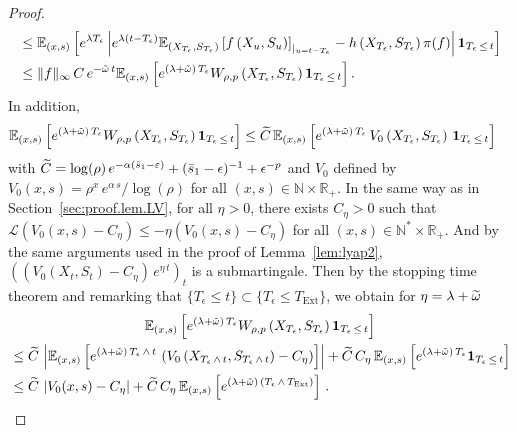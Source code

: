 \documentclass[AHL,Unicode,longabstracts,published]{cedram}
\newcommand{\RR}{\mathbb{R}}
\newcommand{\NN}{\mathbb{N}}
\newcommand{\EE}{\mathbb{E}}
\newcommand{\clL}{\mathcal{L}}
\newcommand{\Text}{T_{\mathrm{Ext}}}
\newcommand{\1}{\mathbf{1}}
\let\oldtilde\tilde
\renewcommand*{\tilde}[1]{\mathchoice{\widetilde{#1}}{\widetilde{#1}}{\oldtilde{#1}}{\oldtilde{#1}}}
\begin{document}
\begin{proof}
\begin{multline}
\begin{aligned}
&\leq
\EE_{(x,s)} \left[e^{\lambda T_\epsilon} \left| e^{\lambda(t-T_\epsilon)}
\EE_{\left(X_{T_\epsilon},S_{T_\epsilon}\right)}\left[f\left(X_{u},S_{u}\right) \right]_{\vert_{u=t-T_\epsilon}}-h\left(X_{T_\epsilon},S_{T_\epsilon}\right)\pi(f)\right| \1_{T_\epsilon\,\leq\,t} \right]\\
&\leq \|f\|_\infty\,C\,e^{-\tilde\omega\,t}
\EE_{(x,s)} \left[e^{\left(\lambda+\tilde\omega\right)\,T_\epsilon}W_{\rho,p}\left(X_{T_\epsilon},S_{T_\epsilon}\right) \1_{T_\epsilon\,\leq\,t} \right].
\end{aligned}
\end{multline}
In addition,
\begin{align*}
\EE_{(x,s)} \left[e^{\left(\lambda+\tilde \omega\right)\, T_\epsilon}W_{\rho,p}\left(X_{T_\epsilon},S_{T_\epsilon}\right) \1_{T_\epsilon\,\leq\,t} \right] &\leq
\tilde C\, \EE_{(x,s)} \left[e^{\left(\lambda+\tilde\omega\right)\, T_\epsilon} \,V_0\left(X_{T_\epsilon},S_{T_\epsilon}\right) \, \1_{T_\epsilon\,\leq\,t} \right]
\end{align*}
with $\tilde C=\log(\rho)\,e^{-\alpha(\bar s_1-\varepsilon)}+(\bar s_1-\epsilon)^{-1}+\epsilon^{-p}$ and $V_0$ defined by $V_0(x,s)=\rho^{x}\,e^{\alpha\,s}/\log(\rho)$ for all $(x,s)\in \NN\times \RR_+$. In the same way as in Section~\ref{sec:proof.lem.LV}, for all $\eta>0$, there exists $C_\eta>0$ such that $\clL(V_0(x,s)-C_\eta)\leq -\eta (V_0(x,s) - C_\eta)$ for all $(x,s)\in \NN^*\times \RR_+$. And by the same arguments used in the proof of Lemma~\ref{lem:lyap2}, $((V_0(X_t,S_t)-C_\eta)\,e^{\eta\,t})_t$ is a submartingale. Then by the stopping time theorem and remarking that $\{T_\epsilon\leq t\} \subset \{T_\epsilon\leq \Text\}$, we obtain for $\eta=\lambda+\tilde \omega$
\begin{multline}\label{eq:dom.exp.T_eps.V_0}
\EE_{(x,s)} \left[e^{(\lambda+\tilde\omega)\, T_\epsilon}W_{\rho,p}\left(X_{T_\epsilon},S_{T_\epsilon}\right) \1_{T_\epsilon\,\leq\,t} \right]
\\
\begin{aligned} 
&\leq
\tilde C\, \left|\EE_{(x,s)} \left[e^{\left(\lambda+\tilde\omega\right)\, T_\epsilon\,\wedge\,t} \,\left(V_0\left(X_{T_\epsilon\,\wedge\,t},S_{T_\epsilon\,\wedge\,t}\right)-C_\eta\right)\right]\right| +\tilde C\,C_\eta\, \EE_{(x,s)} \left[e^{\left(\lambda+\tilde\omega\right)\, T_\epsilon}\1_{T_\epsilon\,\leq\,t} \right]
\\ 
&\leq \tilde C\,\left|V_0(x,s)-C_\eta\right| +\tilde C\,C_\eta\, \EE_{(x,s)} \left[e^{\left(\lambda+\tilde\omega\right)\, \left(T_\epsilon\,\wedge \,\Text\right)} \right]\,.

\end{aligned}
\end{multline}
\end{proof}
\end{document}
